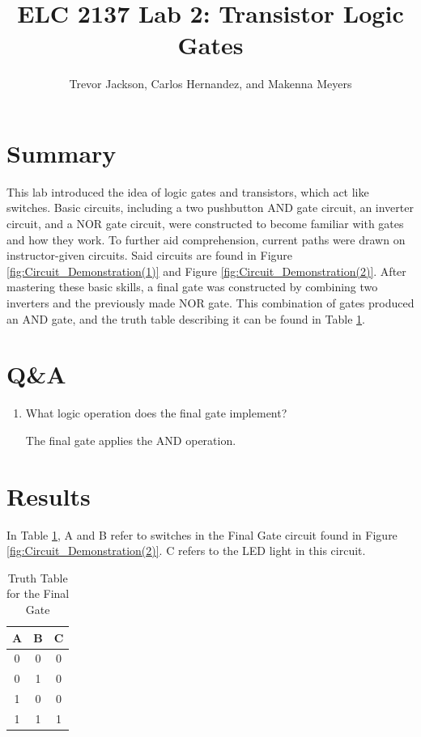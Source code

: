 \documentclass[11pt]{article}
\begin{document}
\title{ELC 2137 Lab 2: Transistor Logic Gates}
\author{Trevor Jackson, Carlos Hernandez, and Makenna Meyers}

\maketitle


\section*{Summary}

This lab introduced the idea of logic gates and transistors, which act like switches. Basic circuits, including a two pushbutton AND gate circuit, an inverter circuit, and a NOR gate circuit, were constructed to become familiar with gates and how they work. To further aid comprehension, current paths were drawn on instructor-given circuits. Said circuits are found in Figure \ref{fig:Circuit_Demonstration(1)} and  Figure \ref{fig:Circuit_Demonstration(2)}. After mastering these basic skills, a final gate was constructed by combining two inverters and the previously made NOR gate. This combination of gates produced an AND gate, and the truth table describing it can be found in Table \ref{tbl:truth_table}.

\section*{Q\&A}

\begin{enumerate}
	\item What logic operation does the final gate implement?
	
	The final gate applies the AND operation.

\end{enumerate}

\section*{Results}

In Table \ref{tbl:truth_table}, A and B refer to switches in the Final Gate circuit found in Figure \ref{fig:Circuit_Demonstration(2)}. C refers to the LED light in this circuit.

\begin{table}[ht]\centering
	\caption{Truth Table for the Final Gate}
	\label{tbl:truth_table}
	\begin{tabular}{cc|c}
    	\toprule
    	A & B & C \\
    	\midrule
    	0 & 0 & 0 \\
    	0 & 1 & 0 \\
    	1 & 0 & 0 \\
    	1 & 1 & 1 \\
    	\bottomrule
    \end{tabular} 
\end{table}
\end{document}
